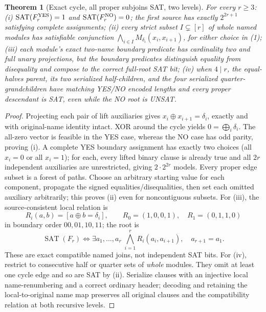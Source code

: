 \documentclass[11pt]{article}
\newtheorem{theorem}{Theorem}
\newcommand{\SAT}{\operatorname{SAT}}
\begin{document}
\begin{theorem}[Exact cycle, all proper subjoins SAT, two levels]\label{thm:cycle}
For every \(r\ge3\): (i) \(\SAT(F_r^{\rm YES})=1\) and \(\SAT(F_r^{\rm NO})=0\); the first source has exactly \(2^{2r+1}\) satisfying complete assignments; (ii) every strict subset \(I\subsetneq[r]\) of whole named modules has satisfiable conjunction \(\bigwedge_{i\in I}M_{\delta_i}(x_i,x_{i+1})\), for either choice in (1); (iii) each module's exact two-name boundary predicate has cardinality two and full unary projections, but the boundary predicates distinguish equality from disequality and compose to the correct full-root SAT bit; (iv) when \(4\mid r\), the equal-halves parent, its two serialized half-children, and the four serialized quarter-grandchildren have matching YES/NO encoded lengths and every \emph{proper} descendant is SAT, even while the NO root is UNSAT.
\end{theorem}
\begin{proof}
Projecting each pair of lift auxiliaries gives \(x_i\oplus x_{i+1}=\delta_i\), exactly and with original-name identity intact. XOR around the cycle yields \(0=\bigoplus_i\delta_i\). The all-zero vector is feasible in the YES case, whereas the NO case has odd parity, proving (i). A complete YES boundary assignment has exactly two choices (all \(x_i=0\) or all \(x_i=1\)); for each, every lifted binary clause is already true and all \(2r\) independent auxiliaries are unrestricted, giving \(2\cdot 2^{2r}\) models. Every proper edge subset is a forest of paths. Choose an arbitrary starting value for each component, propagate the signed equalities/disequalities, then set each omitted auxiliary arbitrarily; this proves (ii) even for noncontiguous subsets. For (iii), the source-consistent local relation is
\[
R_i(a,b)=[a\oplus b=\delta_i],
\qquad R_0=(1,0,0,1),\quad R_1=(0,1,1,0)
\]
in boundary order \(00,01,10,11\); the root is
\[
\SAT(F_r) \iff
\exists a_1,\ldots,a_r\;\bigwedge_{i=1}^r
R_i(a_i,a_{i+1}),\quad a_{r+1}=a_1.
\]
These are exact compatible named joins, not independent SAT bits.
For (iv), restrict to consecutive half or quarter sets of \emph{whole} modules. They omit at least one cycle edge and so are SAT by (ii). Serialize clauses with an injective local name-renumbering and a correct ordinary header; decoding and retaining the local-to-original name map preserves all original clauses and the compatibility relation at both recursive levels.
\end{proof}
\end{document}
